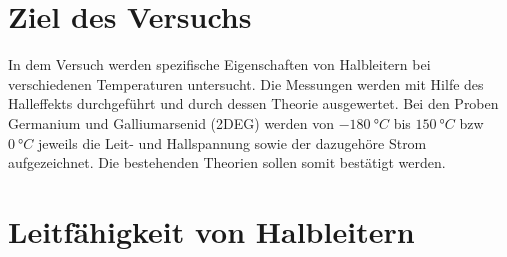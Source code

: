 
\section{Ziel des Versuchs}
In dem Versuch werden spezifische Eigenschaften von Halbleitern bei verschiedenen Temperaturen untersucht. Die Messungen werden mit Hilfe des Halleffekts durchgeführt und durch dessen Theorie ausgewertet. Bei den Proben Germanium und Galliumarsenid (2DEG) werden von $\SI{-180}{°C}$ bis $\SI{150}{°C}$ bzw $\SI{0}{°C}$ jeweils die Leit- und Hallspannung sowie der dazugehöre Strom aufgezeichnet. Die bestehenden Theorien sollen somit bestätigt werden.

\section{Leitfähigkeit von Halbleitern}

